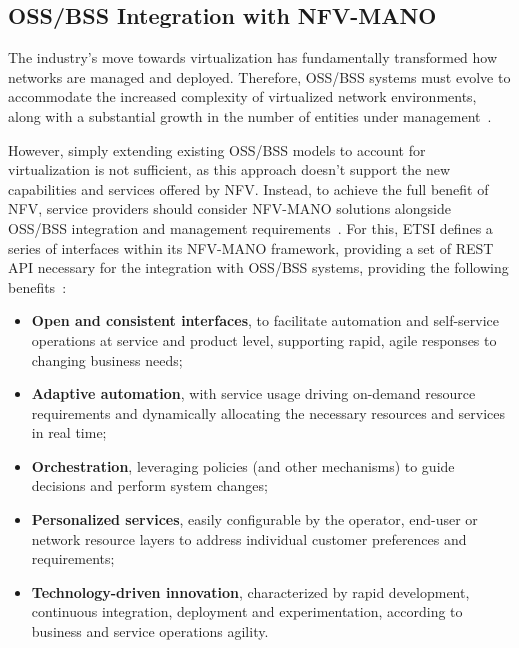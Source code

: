 \subsection{OSS/BSS Integration with NFV-MANO} \label{sec:oss:bss:nfv-mano}

The industry's move towards virtualization has fundamentally transformed how networks are managed and deployed. Therefore, \acs{OSS}/\acs{BSS} systems must evolve to accommodate the increased complexity of virtualized network environments, along with a substantial growth in the number of entities under management~\cite{EricsonOSS}.

However, simply extending existing \acs{OSS}/\acs{BSS} models to account for virtualization is not sufficient, as this approach doesn't support the new capabilities and services offered by \acs{NFV}. Instead, to achieve the full benefit of \acs{NFV}, service providers should consider \acs{NFV-MANO} solutions alongside \acs{OSS}/\acs{BSS} integration and management requirements~\cite{ETSI_GS_NFV_MAN_001_V1_1_1}. For this, \acs{ETSI} defines a series of interfaces within its \acs{NFV-MANO} framework, providing a set of \acs{REST} \acs{API} necessary for the integration with \acs{OSS}/\acs{BSS} systems, providing the following benefits~\cite{ETSI_GS_NFV_MAN_001_V1_1_1}:

\begin{itemize}
    \item \textbf{Open and consistent interfaces}, to facilitate automation and self-service operations at service and product level, supporting rapid, agile responses to changing business needs;

    \item \textbf{Adaptive automation}, with service usage driving on-demand resource requirements and dynamically allocating the necessary resources and services in real time;

    \item \textbf{Orchestration}, leveraging policies (and other mechanisms) to guide decisions and perform system changes;

    \item \textbf{Personalized services}, easily configurable by the operator, end-user or network resource layers to address individual customer preferences and requirements;

    \item \textbf{Technology-driven innovation}, characterized by rapid development, continuous integration, deployment and experimentation, according to business and service operations agility.
\end{itemize}